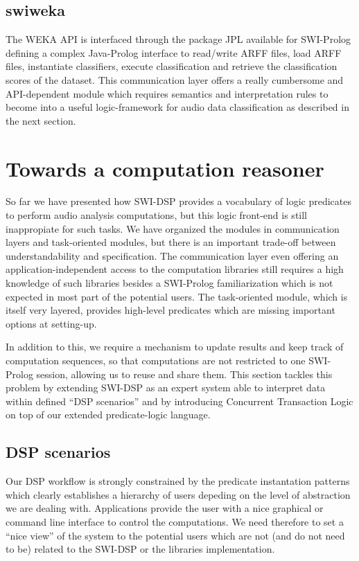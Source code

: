 \documentclass[runningheads]{llncs}
\begin{document}
\subsection{swiweka}\label{subsec:swiweka}

The WEKA API is interfaced through the package JPL available for SWI-Prolog defining a complex Java-Prolog interface to read/write ARFF files, load ARFF files, instantiate classifiers, execute classification and retrieve the classification scores of the dataset. This communication layer offers a really cumbersome and API-dependent module which requires semantics and interpretation rules to become into a useful logic-framework for audio data classification as described in the next section.

\section{Towards a computation reasoner}\label{sec:reasoner}

So far we have presented how SWI-DSP provides a vocabulary of logic predicates to perform audio analysis computations, but this logic front-end is still inappropiate for such tasks. We have organized the modules in communication layers and task-oriented modules, but there is an important trade-off between understandability and specification. The communication layer even offering an application-independent access to the computation libraries still requires a high knowledge of such libraries besides a SWI-Prolog familiarization which is not expected in most part of the potential users. The task-oriented module, which is itself very layered, provides high-level predicates which are missing important options at setting-up.

In addition to this, we require a mechanism to update results and keep track of computation sequences, so that computations are not restricted to one SWI-Prolog session, allowing us to reuse and share them. This section tackles this problem by extending SWI-DSP as an expert system able to interpret data within defined ``DSP scenarios'' and by introducing Concurrent Transaction Logic on top of our extended predicate-logic language.

\subsection{DSP scenarios}\label{subsec:scenarios}

Our DSP workflow is strongly constrained by the predicate instantation patterns which clearly establishes a hierarchy of users depeding on the level of abstraction we are dealing with. Applications provide the user with a nice graphical or command line interface to control the computations. We need therefore to set a ``nice view'' of the system to the potential users which are not (and do not need to be) related to the SWI-DSP or the libraries implementation.
\end{document}
